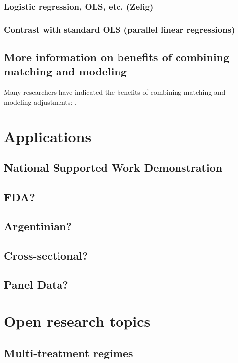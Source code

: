 \documentclass[11pt,titlepage]{article}
\begin{document}
\subsubsection{Logistic regression, OLS, etc. (Zelig)}
\subsubsection{Contrast with standard OLS (parallel linear regressions)}
\subsection{More information on benefits of combining matching and modeling}
Many researchers have indicated the benefits of combining matching and modeling adjustments: \cite{Rubin73b, RobRot95, HecHidTod97, AbaImb04}.                                     

                                                                                                                          
\section{Applications}
\subsection{National Supported Work Demonstration}
\subsection{FDA?}
\subsection{Argentinian?}
\subsection{Cross-sectional?}
\subsection{Panel Data?}
                                                                                                                                                             
 
\section{Open research topics}
\subsection{Multi-treatment regimes}
\end{document}
